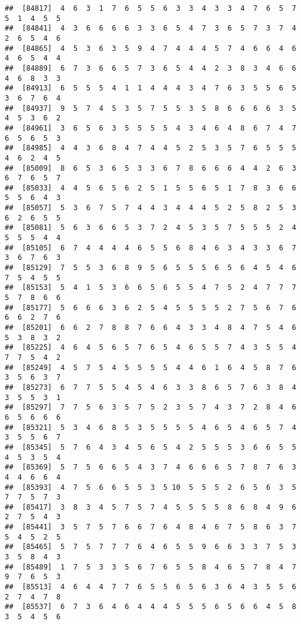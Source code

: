 \documentclass[
]{book}
\begin{document}
\begin{verbatim}
##  [84817]  4  6  3  1  7  6  5  5  6  3  3  4  3  3  4  7  6  5  7  5  1  4  5  5
##  [84841]  4  3  6  6  6  6  3  3  6  5  4  7  3  6  5  7  3  7  4  2  6  5  4  6
##  [84865]  4  5  3  6  3  5  9  4  7  4  4  4  5  7  4  6  6  4  6  4  6  5  4  4
##  [84889]  6  7  3  6  6  5  7  3  6  5  4  4  2  3  8  3  4  6  6  4  6  8  3  3
##  [84913]  6  5  5  5  4  1  1  4  4  4  3  4  7  6  3  5  5  6  5  3  6  7  6  4
##  [84937]  9  5  7  4  5  3  5  7  5  5  3  5  8  6  6  6  6  3  5  4  5  3  6  2
##  [84961]  3  6  5  6  3  5  5  5  5  4  3  4  6  4  8  6  7  4  7  6  5  6  5  3
##  [84985]  4  4  3  6  8  4  7  4  4  5  2  5  3  5  7  6  5  5  5  4  6  2  4  5
##  [85009]  8  6  5  3  6  5  3  3  6  7  8  6  6  6  4  4  2  6  3  6  7  6  5  7
##  [85033]  4  4  5  6  5  6  2  5  1  5  5  6  5  1  7  8  3  6  6  5  5  6  4  3
##  [85057]  5  3  6  7  5  7  4  4  3  4  4  4  5  2  5  8  2  5  3  6  2  6  5  5
##  [85081]  5  6  3  6  6  5  3  7  2  4  5  3  5  7  5  5  5  2  4  5  5  5  4  4
##  [85105]  6  7  4  4  4  4  6  5  5  6  8  4  6  3  4  3  3  6  7  3  6  7  6  3
##  [85129]  7  5  5  3  6  8  9  5  6  5  5  5  6  5  6  4  5  4  6  7  5  4  5  5
##  [85153]  5  4  1  5  3  6  6  5  6  5  5  4  7  5  2  4  7  7  7  5  7  8  6  6
##  [85177]  5  6  6  6  3  6  2  5  4  5  5  5  5  2  7  5  6  7  6  6  6  2  7  6
##  [85201]  6  6  2  7  8  8  7  6  6  4  3  3  4  8  4  7  5  4  6  5  3  8  3  2
##  [85225]  4  6  4  5  6  5  7  6  5  4  6  5  5  7  4  3  5  5  4  7  7  5  4  2
##  [85249]  4  5  7  5  4  5  5  5  5  4  4  6  1  6  4  5  8  7  6  3  5  6  3  7
##  [85273]  6  7  7  5  5  4  5  4  6  3  3  8  6  5  7  6  3  8  4  3  5  5  3  1
##  [85297]  7  7  5  6  3  5  7  5  2  3  5  7  4  3  7  2  8  4  6  6  5  6  6  6
##  [85321]  5  3  4  6  8  5  3  5  5  5  5  4  6  5  4  6  5  7  4  3  5  5  6  7
##  [85345]  5  7  6  4  3  4  5  6  5  4  2  5  5  5  3  6  6  5  5  4  5  3  5  4
##  [85369]  5  7  5  6  6  5  4  3  7  4  6  6  6  5  7  8  7  6  3  4  4  6  6  4
##  [85393]  4  7  5  6  6  5  5  3  5 10  5  5  5  2  6  5  6  3  5  7  7  5  7  3
##  [85417]  3  8  3  4  5  7  5  7  4  5  5  5  5  8  6  8  4  9  6  2  7  5  4  3
##  [85441]  3  5  7  5  7  6  6  7  6  4  8  4  6  7  5  8  6  3  7  5  4  5  2  5
##  [85465]  5  7  5  7  7  7  6  4  6  5  5  9  6  6  3  3  7  5  3  3  5  8  4  3
##  [85489]  1  7  5  3  3  5  6  7  6  5  5  8  4  6  5  7  8  4  7  9  7  6  5  3
##  [85513]  4  6  4  4  7  7  6  5  5  6  5  6  3  6  4  3  5  5  6  2  7  4  7  8
##  [85537]  6  7  3  6  4  6  4  4  4  5  5  5  6  5  6  6  4  5  8  3  5  4  5  6

\end{verbatim}
\end{document}
